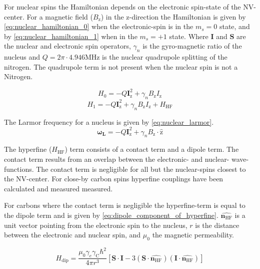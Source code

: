 For nuclear spins the Hamiltonian depends on the electronic spin-state of the NV-center.
For a magnetic field ($B_\mathrm{z}$) in the z-direction the Hamiltonian is given by \cref{eq:nuclear_hamiltonian_0} when the electronic-spin is in the $m_s = 0$ state, and by \cref{eq:nuclear_hamiltonian_1} when in the $m_s = +1$ state\citep{Taminiau2014Universal}.
Where $\bm{I}$ and $\bm{S}$ are the nuclear and electronic spin operators, $\gamma_n$ is the gyro-magnetic ratio of the nucleus and $Q= 2\pi \cdot 4.946 \mathrm{ MHz}$ is the nuclear quadrupole splitting of the nitrogen.
The quadrupole term is not present when the nuclear spin is not a Nitrogen.

\begin{equation}
    \label{eq:nuclear_hamiltonian_0}
    H_0= -Q\bm{I}_{\mathrm{z}}^2+ \gamma_{n} B_\mathrm{z} I_\mathrm{z}
\end{equation}
\begin{equation}
    \label{eq:nuclear_hamiltonian_1}
    H_1 = -Q\bm{I}_{\mathrm{z}}^2+\gamma_{n} B_\mathrm{z} I_\mathrm{z} +H_{\mathrm{HF}}
\end{equation}

The Larmor frequency for a nucleus is given by  \cref{eq:nuclear_larmor}.
\begin{equation}
\label{eq:nuclear_larmor}
\bm{\omega_L} =-Q\bm{I}_{\mathrm{z}}^2+ \gamma_{n}B_\mathrm{z} \cdot\bm{\hat{\mathrm{z}}}
\end{equation}

The hyperfine ($H_{\mathrm{HF}}$) term consists of a contact term and a dipole term.
The contact term results from an overlap between the electronic- and nuclear- wave-functions.
The contact term is negligible for all but the nuclear-spins closest to the NV-center.
For close-by carbon spins hyperfine couplings have been  calculated\citep{Gali2008Ab,Gali2009Identification} and measured measured\citep{Smeltzer201113}.

For carbons where the contact term is negligible the hyperfine-term is equal to the dipole term and is given by \cref{eq:dipole_component_of_hyperfine}\citep{Lange2012Quantum}.
$\hat{\bm{n_{\mathrm{HF}}}}$ is a unit vector pointing from the electronic spin to the nucleus, $r$ is the distance between the electronic and nuclear spin, and $\mu_0$ the magnetic permeability.

\begin{equation}
\label{eq:dipole_component_of_hyperfine}
H_{\mathrm{dip}} = \frac{\mu_0 \gamma_e \gamma_{\mathrm{C}} \hbar^2 }{4 \pi r^3} [ \bm{S \cdot I} - 3 (\bm S \cdot \hat{\bm{n_{\mathrm{HF}}}})(\bm I \cdot \hat{\bm{n_{\mathrm{HF}}}})]
\end{equation}

